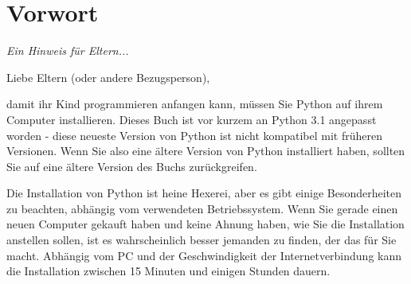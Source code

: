 

\chapter*{Vorwort}\normalsize
\begin{center}
{\em Ein Hinweis für Eltern...}
\end{center}
\pagestyle{plain}

\noindent
Liebe Eltern (oder andere Bezugsperson),

damit ihr Kind programmieren anfangen kann, müssen Sie Python auf ihrem Computer installieren. Dieses Buch ist vor kurzem an Python 3.1 angepasst worden - diese neueste Version von Python ist nicht kompatibel mit früheren Versionen. Wenn Sie also eine ältere Version von Python installiert haben, sollten Sie auf eine ältere Version des Buchs zurückgreifen.

Die Installation von Python ist heine Hexerei, aber es gibt einige Besonderheiten zu beachten, abhängig vom verwendeten Betriebssystem. Wenn Sie gerade einen neuen Computer gekauft haben und keine Ahnung haben, wie Sie die Installation anstellen sollen, ist es wahrscheinlich besser jemanden zu finden, der das für Sie macht. Abhängig vom PC und der Geschwindigkeit der Internetverbindung kann die Installation zwischen 15 Minuten und einigen Stunden dauern.

